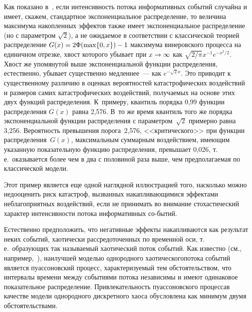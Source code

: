 \begin{multicols}{2}
Как показано в~\cite{KorolevSokolov2008}, если интенсивность пото\-ка
информативных событий случайна и имеет, скажем, стандартное
экспоненциальное распределение, то величина максимума накопленных
эффектов также имеет экспоненциальное распределение (но с параметром
$\sqrt{2}$), а не ожидаемое в соответствии с классической теорией
распределение $G(x)\hm=2\Phi(\max\{0,x\})-1$ максимума винеровского
процесса на единичном отрезке, хвост которого убывает при
$x\hm\to\infty$ как $\sqrt{2/\pi}x^{-1}e^{-x^2/2}$.  Хвост же
упомянутой выше экспоненциальной функции распределения, естественно,
убывает существенно медленнее~--- как $e^{-\sqrt{2}x}$. Это приводит
к существенному различию в оценках вероятностей катастрофических
воздействий и размеров самих катастрофических воздействий,
получаемых на основе этих двух функций распределения. К~примеру,
квантиль порядка 0,99 функции распределения $G(x)$ равна 2,576. В~то
же время квантиль того же порядка экспоненциальной функции
распределения с па\-ра\-мет\-ром~$\sqrt{2}$ примерно равна 3,256.
Вероятность превышения порога~2,576, <<критического>> при функции
распределения~$G(x)$, максимальным суммарным воздействием, име\-ющим
указанную показательную функцию распределения, превышает 0,026, т.\,е.\ 
оказывается более чем в два с половиной раза выше, чем
предполагаемая по классической модели. 

Этот %
пример является еще
одной наглядной иллюстрацией того, насколько можно недооценить риск
ка\-та\-ст\-роф, вызванных накапливающимися эффектами неблагоприятных
воздействий, если не принимать во внимание стохастический характер
интенсивности потока информативных со-\linebreak бытий.

Естественно предположить, что негативные эффекты накапливаются как
результат неких событий, хаотически рассредоточенных по
временн$\acute{\mbox{о}}$й оси, т.\,е.\ образующих так называемый хаотический
поток событий. Как известно (см., например,~\cite{KorolevSokolov2008}),\linebreak 
наилучшей моделью однородного
хаотического\linebreak потока событий является пуассоновский процесс,
характеризуемый тем обстоятельством, что интервалы времени между
событиями потока независимы и имеют одинаковое показательное
распределение. Привлекательность пуассоновского процесса\linebreak в качестве
модели однородного дискретного хаоса обусловлена как минимум двумя
обстоятельствами. 


\end{multicols}
